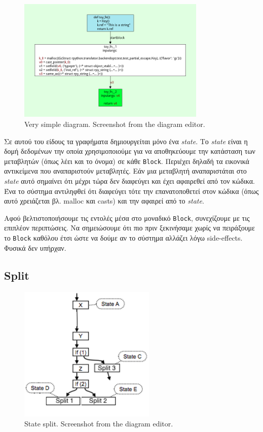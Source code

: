\begin{figure}[h]
\centering
\includegraphics[width=0.8\textwidth]{simplest-func.png}
\caption{Very simple diagram. Screenshot from the diagram editor.}
\label{figure-4}
\end{figure}

Σε αυτού του είδους τα γραφήματα δημιουργείται μόνο ένα \textit{state}. Το
\textit{state} είναι η δομή δεδομένων την οποία χρησιμοποιούμε για να
αποθηκεύουμε την κατάσταση των μεταβλητών (όπως λέει και το όνομα) σε κάθε
\texttt{Block}. Περιέχει δηλαδή τα εικονικά αντικείμενα που αναπαριστούν
μεταβλητές. Εάν μια μεταβλητή αναπαριστάται στο \textit{state} αυτό σημαίνει ότι
μέχρι τώρα δεν διαφεύγει και έχει αφαιρεθεί από τον κώδικα. Ένα το σύστημα
αντιληφθεί ότι διαφεύγει τότε την επανατοποθετεί στον κώδικα  (όπως αυτό
χρειάζεται βλ. malloc και casts) και την αφαιρεί από το \textit{state}.

Αφού βελτιστοποιήσουμε τις εντολές μέσα στο μοναδικό \texttt{Block}, συνεχίζουμε
με τις επιπλέον περιπτώσεις. Να σημειώσουμε ότι πιο πριν ξεκινήσαμε χωρίς να
πειράξουμε το \texttt{Block} καθόλου έτσι ώστε να δούμε αν το σύστημα αλλάζει
λόγω side-effects. Φυσικά δεν υπήρχαν.

\subsection{Split}

\begin{figure}
\caption{State split. Screenshot from the diagram editor.}
\label{wrapped-figure}
\includegraphics[width=6.5cm]{split-state.png}
\end{figure} 

